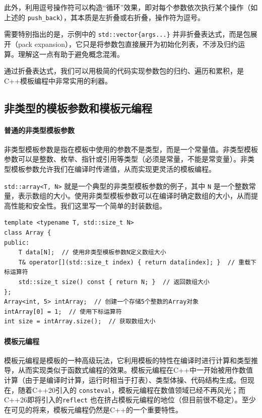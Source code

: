 此外，利用逗号操作符可以构造“循环”效果，即对每个参数依次执行某个操作（如上述的 \verb|push_back|），其本质是左折叠或右折叠，操作符为逗号。

需要特别指出的是，示例中的 \verb|std::vector{args...}| 并非折叠表达式，而是包展开（pack expansion），它只是将参数包直接展开为初始化列表，不涉及归约运算。理解这一点有助于避免概念混淆。

通过折叠表达式，我们可以用极简的代码实现参数包的归约、遍历和累积，是C++模板编程中非常实用的利器。

\subsection{非类型的模板参数和模板元编程}

\paragraph{普通的非类型模板参数}

非类型模板参数是指在模板中使用的参数不是类型，而是一个常量值。非类型模板参数可以是整数、枚举、指针或引用等类型（必须是常量，不能是常变量）。非类型模板参数允许我们在编译时传递值，从而实现更灵活的模板编程。

\verb|std::array<T, N>| 就是一个典型的非类型模板参数的例子，其中 \verb|N| 是一个整数常量，表示数组的大小。使用非类型模板参数可以在编译时确定数组的大小，从而提高性能和安全性。我们这里写一个简单的封装数组。

\begin{verbatim}
template <typename T, std::size_t N>
class Array {
public:
    T data[N];  // 使用非类型模板参数N定义数组大小
    T& operator[](std::size_t index) { return data[index]; }  // 重载下标运算符
    std::size_t size() const { return N; }  // 返回数组大小
};
Array<int, 5> intArray;  // 创建一个存储5个整数的Array对象
intArray[0] = 1;  // 使用下标运算符
int size = intArray.size();  // 获取数组大小
\end{verbatim}

\paragraph{模板元编程}

模板元编程是模板的一种高级玩法，它利用模板的特性在编译时进行计算和类型推导，从而实现类似于函数式编程的效果。模板元编程在C++中一开始被用作数值计算（由于是编译时计算，运行时相当于打表）、类型体操、代码结构生成。但现在，随着C++20引入的 \verb|consteval|，模板元编程在数值领域已经不再风光；而C++26即将引入的\verb|reflect| 也在挤占模板元编程的地位（但目前很不稳定）。至少在可见的将来，模板元编程仍然是C++的一个重要特性。

